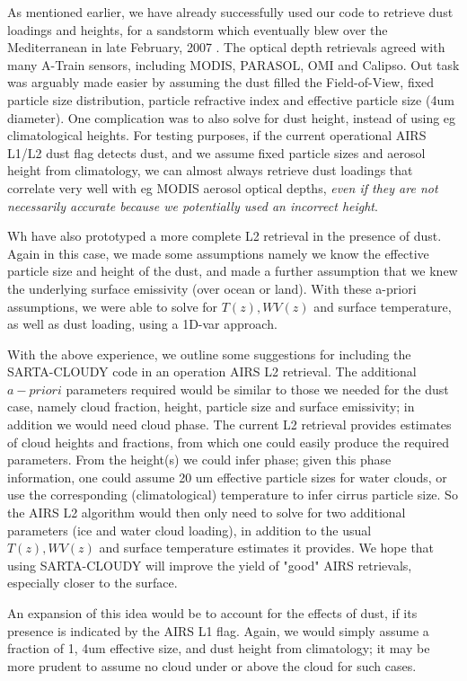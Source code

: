 \documentclass[11pt]{article}
\newcommand{\sasc}{\textsf{SARTA-CLOUDY}\xspace}
\begin{document}
As mentioned earlier, we have already successfully used our code to retrieve dust loadings and heights, for a 
sandstorm which eventually blew over the Mediterranean in late February, 2007 \cite{mac:10}. The optical depth 
retrievals agreed with many A-Train sensors, including MODIS, PARASOL, OMI and Calipso. Out task was arguably made easier
by assuming the dust filled the Field-of-View, fixed particle size distribution, particle refractive index and 
effective particle size (4um diameter). One complication was to also solve for dust height, instead of using eg 
climatological heights. For testing purposes, 
if the current operational AIRS L1/L2 dust flag detects dust, and we assume fixed particle sizes and aerosol height
from climatology, we can almost always retrieve dust loadings that correlate very well with eg MODIS aerosol optical depths,
{\em even if they are not necessarily accurate because we potentially used an incorrect height}.

Wh have also prototyped a more complete L2 retrieval in the presence of dust. Again in this case, we made some assumptions
namely we know the effective particle size and height of the dust, and made a further assumption that we knew the underlying
surface emissivity (over ocean or land). With these a-priori assumptions, we were able to solve for $T(z),WV(z)$ and surface
temperature, as well as dust loading, using a 1D-var approach.

With the above experience, we outline some suggestions for including the \sasc code in an operation AIRS L2 retrieval.
The additional $a-priori$ parameters required would be similar to those we needed for the dust case, namely cloud fraction,
height, particle size and surface emissivity; in addition we would need cloud phase. The current L2 retrieval provides 
estimates of cloud heights and fractions, from which one could easily produce the required parameters. From the height(s) 
we could infer phase; given this phase information, one could assume 20 um effective particle sizes for water clouds, or use
the corresponding (climatological) temperature to infer cirrus particle size. So the AIRS L2 algorithm would then
only need to solve for two additional parameters (ice and water cloud loading), in addition to the usual $T(z),WV(z)$
and surface temperature estimates it provides. We hope that using \sasc will improve the yield of "good" AIRS 
retrievals, especially closer to the surface.

An expansion of this idea would be to account for the effects of dust, if its presence is indicated by the
AIRS L1 flag. Again, we would simply assume a fraction of 1, 4um effective size, and dust height from climatology; 
it may be more prudent to assume no cloud under or above the cloud for such cases. 
\end{document}
